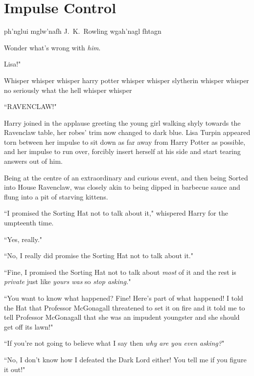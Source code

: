 \chapter{Impulse Control}

\begin{chapterOpeningAuthorNote}
ph'nglui mglw'nafh J.~K.~Rowling wgah'nagl fhtagn
\end{chapterOpeningAuthorNote}
\begin{chapterOpeningQuote}
Wonder what's wrong with \emph{him}.
\end{chapterOpeningQuote}

 Lisa!"

\hplettrineextrapara
Whisper whisper whisper harry potter whisper whisper slytherin whisper whisper no seriously what the hell whisper whisper

``RAVENCLAW!"

Harry joined in the applause greeting the young girl walking shyly towards the Ravenclaw table, her robes' trim now changed to dark blue. Lisa Turpin appeared torn between her impulse to sit down as far away from Harry Potter as possible, and her impulse to run over, forcibly insert herself at his side and start tearing answers out of him.

Being at the centre of an extraordinary and curious event, and then being Sorted into House Ravenclaw, was closely akin to being dipped in barbecue sauce and flung into a pit of starving kittens.

``I promised the Sorting Hat not to talk about it," whispered Harry for the umpteenth time.

``Yes, really."

``No, I really did promise the Sorting Hat not to talk about it."

``Fine, I promised the Sorting Hat not to talk about \emph{most} of it and the rest is \emph{private} just like \emph{yours was} so \emph{stop asking.}"

``You want to know what happened? Fine! Here's part of what happened! I told the Hat that Professor McGonagall threatened to set it on fire and it told me to tell Professor McGonagall that she was an impudent youngster and she should get off its lawn!"

``If you're not going to believe what I say then \emph{why are you even asking?}"

``No, I don't know how I defeated the Dark Lord either! You tell me if you figure it out!"

